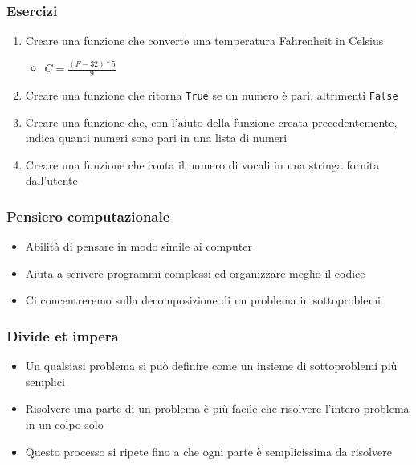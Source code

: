 \begin{exerciseframe}
    \frametitle{Esercizi}

    \begin{enumerate}
        \item Creare una funzione che converte una temperatura Fahrenheit in Celsius
        \begin{itemize}
            \item $C = \frac{(F - 32) * 5}{9}$
        \end{itemize}
        \pause
        \bigskip
        \item Creare una funzione che ritorna \texttt{True} se un numero è pari, altrimenti \texttt{False}
        \pause
        \bigskip
        \item Creare una funzione che, con l'aiuto della funzione creata precedentemente, indica quanti numeri sono pari in una lista di numeri
        \pause
        \bigskip
        \item Creare una funzione che conta il numero di vocali in una stringa fornita dall'utente
    \end{enumerate}
\end{exerciseframe}


\begin{contentframe}
    \frametitle{Pensiero computazionale}

    \begin{itemize}
        \item Abilità di pensare in modo simile ai computer
        \bigskip
        \item Aiuta a scrivere programmi complessi ed organizzare meglio il codice
        \bigskip
        \item Ci concentreremo sulla decomposizione di un problema in sottoproblemi
    \end{itemize}
\end{contentframe}


\begin{contentframe}
    \frametitle{Divide et impera}

    \begin{itemize}
        \item Un qualsiasi problema si può definire come un insieme di sottoproblemi più semplici
        \item Risolvere una parte di un problema è più facile che risolvere l'intero problema in un colpo solo
        \bigskip
        \item Questo processo si ripete fino a che ogni parte è semplicissima da risolvere
    \end{itemize}
\end{contentframe}

